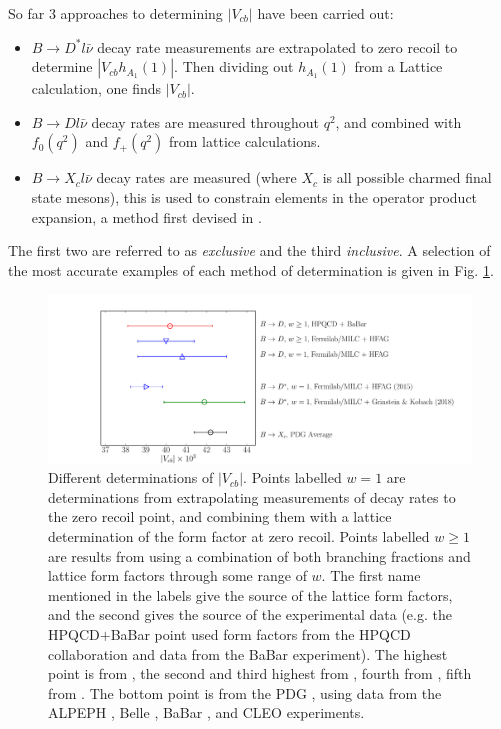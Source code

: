 So far 3 approaches to determining $|V_{cb}|$ have been carried out:
\begin{itemize}
\item
  $B\to D^* l\bar{\nu}$ decay rate measurements are extrapolated to zero recoil to determine $|V_{cb}h_{A_1}(1)|$. Then dividing out $h_{A_1}(1)$ from a Lattice calculation, one finds $|V_{cb}|$.
\item
  $B\to D l\bar{\nu}$ decay rates are measured throughout $q^2$, and combined with $f_0(q^2)$ and $f_+(q^2)$ from lattice calculations.
\item
  $B\to X_c l\bar{\nu}$ decay rates are measured (where $X_c$ is all possible charmed final state mesons), this is used to constrain elements in the operator product expansion, a method first devised in \cite{Bigi:1996si,Hoang:1998hm}.
\end{itemize}
The first two are referred to as {\it{exclusive}} and the third {\it{inclusive}}. A selection of the most accurate examples of each method of determination is given in Fig. \ref{fig:Vcb_plot}.
\begin{figure}
  \vspace{-10pt}
  \hspace{-40pt}
    \includegraphics[width=1.2\textwidth]{images/Vcb_plot.pdf}
  \caption{Different determinations of $|V_{cb}|$. Points labelled $w=1$ are determinations from extrapolating measurements of decay rates to the zero recoil point, and combining them with a lattice determination of the form factor at zero recoil. Points labelled $w\geq 1$ are results from using a combination of both branching fractions and lattice form factors through some range of $w$. The first name mentioned in the labels give the source of the lattice form factors, and the second gives the source of the experimental data (e.g. the HPQCD$+$BaBar point used form factors from the HPQCD collaboration and data from the BaBar experiment). The highest point is from \cite{Na:2015kha}, the second and third highest from \cite{Lattice:2015rga}, fourth from \cite{Bailey:2014tva}, fifth from \cite{Grinstein:2017nlq}. The bottom point is from the PDG \cite{PhysRevD.98.030001}, using data from the ALPEPH \cite{BUSKULIC1995236}, Belle \cite{Abe:2001yf}, BaBar \cite{Aubert:2008yv,Aubert:2009ac}, and CLEO \cite{Bartelt:1998dq} experiments.
    \label{fig:Vcb_plot}}
\end{figure}

